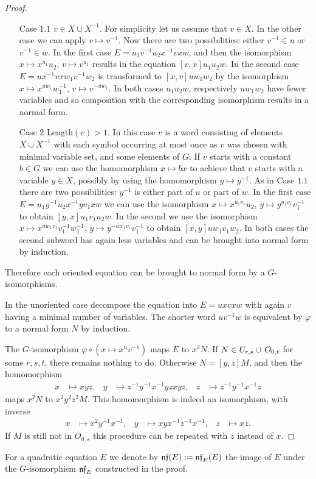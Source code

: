 \documentclass[a4paper,11pt]{amsart}
\begin{document}
\begin{proof}
\begin{itemize}
  \item[Case $1.1$] $v\in X\cup X^{-1}$. For simplicity let us assume
    that $v\in X$. In the other case we can apply $v \mapsto v^{-1}$.
    Now there are two possibilities: either $v^{-1} \in u$ or
    $v^{-1} \in w$. In the first case $E= u_1v^{-1}u_2x^{-1}vxw$, and
    then the isomorphism $x \mapsto x^{u_1}u_2$, $v \mapsto v^{u_1}$
    results in the equation $[v,x]u_1u_2w$. In the second case
    $E= ux^{-1}vxw_1v^{-1}w_2$ is transformed to $[x,v]uw_1w_2$ by the
    isomorphism $x \mapsto x^{uw_1}w_1^{-1}$, $v\mapsto v^{-uw_1}$. In
    both cases $u_1u_2w$, respectively $uw_1w_2$ have fewer variables
    and so composition with the corresponding isomorphism results in a
    normal form.
  \item[Case $2$] Length$(v)>1$. In this case $v$ is a word consisting of
    elements $X\cup X^{-1}$ with each symbol occurring at most once as
    $v$ was chosen with minimal variable set, and some elements of
    $G$.  If $v$ starts with a constant $b\in G$ we can use the
    homomorphism $x\mapsto bx$ to achieve that $v$ starts with a
    variable $y\in X$, possibly by using the homomorphism 
    $y \mapsto y^{-1}$. As in Case
    $1.1$ there are two possibilities: $y^{-1}$ is either part of $u$
    or part of $w$. In the first case $E= u_1 y^{-1} u_2 x^{-1}yv_1xw$
    we can use the isomorphism $x\mapsto x^{u_1v_1}u_2$,
    $y\mapsto y^{u_1v_1}v_1^{-1}$ to obtain $[y,x]u_1v_1u_2w$. In the
    second we use the isomorphism
    $x\mapsto x^{uw_1v_1}v_1^{-1}w_1^{-1}$,
    $y\mapsto y^{-uw_1v_1}v_1^{-1}$ to obtain $[x,y]uw_1v_1w_2$. In
    both cases the second subword has again less variables and can be
    brought into normal form by induction.
  \end{itemize}
  Therefore each oriented equation can be brought to normal form by a
  $G$-iso\-mor\-phisms.

  In the unoriented case decompose the equation into $E = uxvxw$ with
  again $v$ having a minimal number of variables.  The shorter word
  $uv^{-1}w$ is equivalent by $\varphi$ to a normal form $N$ by
  induction.
 
  The $G$-isomorphism $\varphi \circ (x\mapsto x^uv^{-1})$ maps $E$ to
  $x^2N$. If $N\in U_{r,s}\cup\thinspace O_{0,t}$ for some $r,s,t$,
  there remains nothing to do.  Otherwise $N=[y,z]M$, and then the
  homomorphism
  \begin{align*}
    x&\mapsto xyz, & y&\mapsto z^{-1}y^{-1}x^{-1}yzxyz, & z&\mapsto z^{-1}y^{-1}x^{-1}z
  \end{align*}
  maps $x^2N$ to $x^2y^2z^2M$. This homomorphism is indeed an
  isomorphism, with inverse
  \begin{align*}
    x&\mapsto x^2y^{-1}x^{-1}, & y&\mapsto xyx^{-1}z^{-1}x^{-1}, & z&\mapsto xz.
  \end{align*}
  If $M$ is still not in $O_{0,s}$ this procedure can be repeated with
  $z$ instead of $x$.
\end{proof}
For a quadratic equation $E$ we denote by $\mathfrak{nf}(E) := \mathfrak{nf}_E(E)$
the image of $E$ under the $G$-isomorphism $\mathfrak{nf}_E$ constructed in
the proof.
\end{document}
